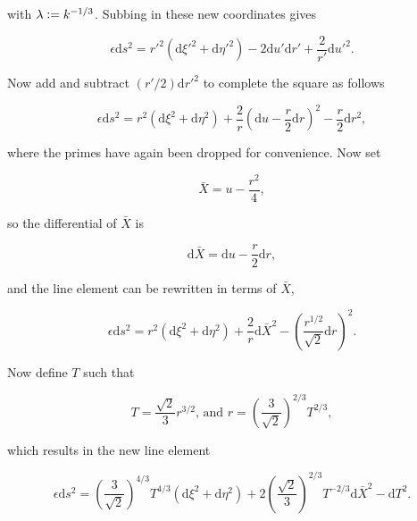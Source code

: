\noindent with $\lambda \vcentcolon = k^{-1/3}$. Subbing in these new coordinates gives

\begin{equation*}  
\epsilon \mathrm{d} s^2 = {r'}^2 (\mathrm{d} {\xi'}^2 + \mathrm{d} {\eta'}^2) - 2 \mathrm{d} u' \mathrm{d} r' + \frac{2}{r'}\mathrm{d} {u'}^2.
\end{equation*}

\noindent Now add and subtract $(r'/2) \mathrm{d} {r'}^2$ to complete the square as follows

\begin{equation*}  
\epsilon \mathrm{d} s^2 = r^2 (\mathrm{d} \xi^2 + \mathrm{d} \eta^2) + \frac{2}{r}{\left( \mathrm{d} u  - \frac{r}{2} \mathrm{d} r\right)}^2 - \frac{r}{2}\mathrm{d} r^2,
\end{equation*}

\noindent where the primes have again been dropped for convenience. Now set

\begin{equation*}
\bar{X} = u - \frac{r^2}{4},
\end{equation*}

\noindent so the differential of $\bar{X}$ is

\begin{equation*}
\mathrm{d} \bar{X} = \mathrm{d} u - \frac{r}{2} \mathrm{d}r,
\end{equation*}

\noindent and the line element can be rewritten in terms of $\bar{X}$,

\begin{equation*}
\epsilon \mathrm{d} s^2 = r^2 (\mathrm{d} \xi^2 + \mathrm{d} \eta^2) + \frac{2}{r} \mathrm{d} \bar{X}^2 - {\left( \frac{r^{1/2}}{\sqrt{2}} \mathrm{d} r\right)}^{2}.
\end{equation*}

\noindent Now define $T$ such that

\begin{equation*}
T = \frac{\sqrt{2}}{3} r^{3/2} \text{,       and    } r = {\left( \frac{3}{\sqrt{2}} \right)}^{2/3} T^{2/3},
\end{equation*}

\noindent which results in the new line element

\begin{equation*}
\epsilon \mathrm{d} s^2 = \left( \frac{3}{\sqrt{2}} \right)^{4/3} T^{4/3} (\mathrm{d} \xi^2 + \mathrm{d} \eta^2) + 2 \left( \frac{\sqrt{2}}{3}\right)^{2/3} T^{-2/3} \mathrm{d} \bar{X}^2 - \mathrm{d} T^2.
\end{equation*}

